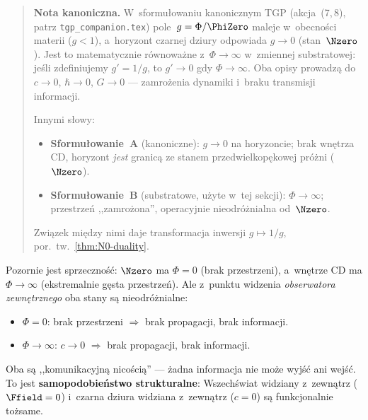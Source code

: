 \begin{quote}
\textbf{Nota kanoniczna.}
W~sformu\l{}owaniu kanonicznym TGP (akcja~(7,\,8),
patrz \texttt{tgp\_companion.tex}) pole~$g = \Phi/\PhiZero$
maleje w~obecno\'sci materii ($g < 1$), a~horyzont czarnej dziury
odpowiada $g \to 0$ (stan~$\Nzero$).
Jest to matematycznie r\'ownowa\.zne z~$\Phi \to \infty$
w~zmiennej substratowej: je\'sli zdefiniujemy $g' = 1/g$,
to $g' \to 0$ gdy $\Phi \to \infty$.
Oba opisy prowadz\k{a} do $c \to 0$, $\hbar \to 0$, $G \to 0$
--- zamro\.zenia dynamiki i~braku transmisji informacji.

\medskip\noindent
Innymi s\l{}owy:
\begin{itemize}[nosep]
  \item \textbf{Sformu\l{}owanie~A} (kanoniczne):
    $g \to 0$ na horyzoncie; brak wn\k{e}trza CD,
    horyzont \emph{jest} granic\k{a} ze stanem
    przedwielkop\k{e}kowej pr\'o\.zni ($\Nzero$).
  \item \textbf{Sformu\l{}owanie~B} (substratowe, u\.zyte w~tej sekcji):
    $\Phi \to \infty$; przestrze\'n ,,zamro\.zona'',
    operacyjnie nieodr\'o\.znialna od~$\Nzero$.
\end{itemize}
Zwi\k{a}zek mi\k{e}dzy nimi daje transformacja inwersji
$g \mapsto 1/g$, por.\ tw.~\ref{thm:N0-duality}.
\end{quote}

\begin{remark}
Pozornie jest sprzeczno\'s\'c: $\Nzero$ ma $\Phi = 0$ (brak
przestrzeni), a~wn\k{e}trze CD ma $\Phi \to \infty$ (ekstremalnie
g\k{e}sta przestrze\'n). Ale z~punktu widzenia \emph{obserwatora
zewn\k{e}trznego} oba stany s\k{a} nieodr\'o\.znialne:
\begin{itemize}[nosep]
  \item $\Phi = 0$: brak przestrzeni $\Rightarrow$ brak
        propagacji, brak informacji.
  \item $\Phi \to \infty$: $c \to 0$ $\Rightarrow$ brak
        propagacji, brak informacji.
\end{itemize}
Oba s\k{a} ,,komunikacyjn\k{a} nico\'sci\k{a}'' --- \.zadna informacja
nie mo\.ze wyj\'s\'c ani wej\'s\'c. To jest \textbf{samopodobie\'nstwo
strukturalne}: Wszech\'swiat widziany z~zewn\k{a}trz ($\Ffield = 0$)
i~czarna dziura widziana z~zewn\k{a}trz ($c = 0$) s\k{a}
funkcjonalnie to\.zsame.
\end{remark}

